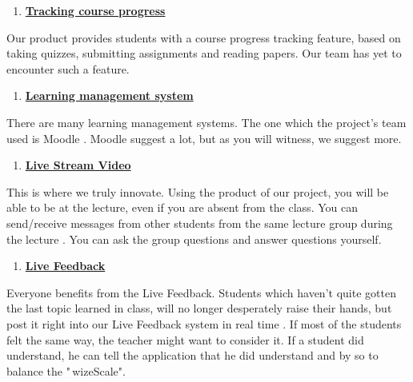 \documentclass[12pt,a4paper]{article}
\begin{document}
    \begin{enumerate}
        \setcounter{enumi}{\thenumberedCntBD}
        \item \textbf{\underline{Tracking course progress}}
        \setcounter{numberedCntBD}{\theenumi}
    \end{enumerate}
    Our product provides students with a course progress tracking feature,
    based on taking quizzes, submitting assignments and reading papers. Our
    team has yet to encounter such a feature.



    \begin{enumerate}
        \setcounter{enumi}{\thenumberedCntBD}
        \item \textbf{\underline{Learning management system}}
        \setcounter{numberedCntBD}{\theenumi}
    \end{enumerate}
    There are many learning management systems. The one which the project's
    team used is Moodle \cite{moodle,usingmoodle}. Moodle suggest a lot, but as you will witness, we suggest more.

    \begin{enumerate}
        \setcounter{enumi}{\thenumberedCntBD}
        \item \textbf{\underline{Live Stream Video}}
        \setcounter{numberedCntBD}{\theenumi}
    \end{enumerate}
    This is where we truly innovate. Using the product of our project, you
    will be able to be at the lecture, even if you are absent from the
    class. You can send/receive messages from other students from the same
    lecture group during the lecture  \cite{onlinecourses}. You can ask the group questions and
    answer questions yourself.



    \begin{enumerate}
        \setcounter{enumi}{\thenumberedCntBD}
        \item \textbf{\underline{Live Feedback}}
        \setcounter{numberedCntBD}{\theenumi}
    \end{enumerate}
    Everyone benefits from the Live Feedback. Students which haven't quite
    gotten the last topic learned in class, will no longer desperately raise
    their hands, but post it right into our Live Feedback system in real
    time \cite{childrencomputer}. If most of the students felt the same way, the teacher might want
    to consider it. If a student did understand, he can tell the application
    that he did understand and by so to balance the "\,wizeScale".
\end{document}
